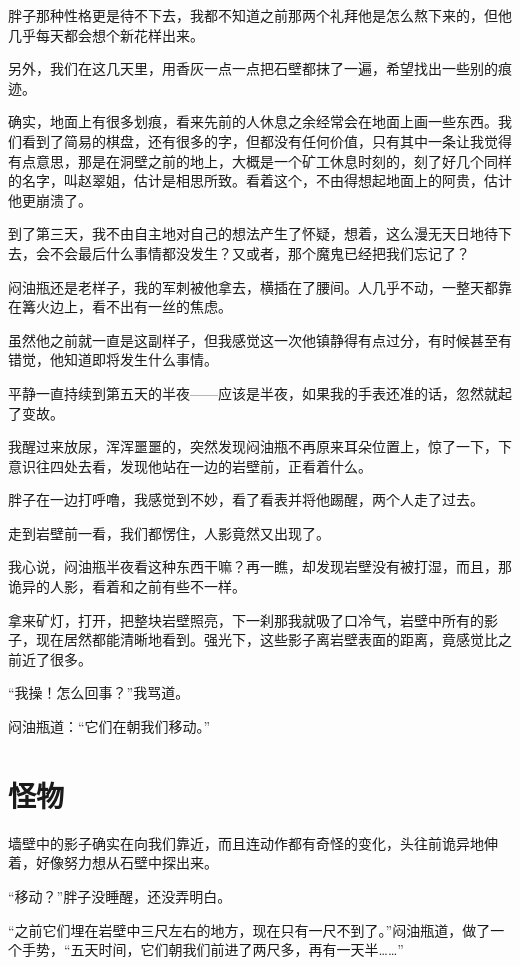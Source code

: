 胖子那种性格更是待不下去，我都不知道之前那两个礼拜他是怎么熬下来的，但他几乎每天都会想个新花样出来。

另外，我们在这几天里，用香灰一点一点把石壁都抹了一遍，希望找出一些别的痕迹。

确实，地面上有很多划痕，看来先前的人休息之余经常会在地面上画一些东西。我们看到了简易的棋盘，还有很多的字，但都没有任何价值，只有其中一条让我觉得有点意思，那是在洞壁之前的地上，大概是一个矿工休息时刻的，刻了好几个同样的名字，叫赵翠姐，估计是相思所致。看着这个，不由得想起地面上的阿贵，估计他更崩溃了。

到了第三天，我不由自主地对自己的想法产生了怀疑，想着，这么漫无天日地待下去，会不会最后什么事情都没发生？又或者，那个魔鬼已经把我们忘记了？

闷油瓶还是老样子，我的军刺被他拿去，横插在了腰间。人几乎不动，一整天都靠在篝火边上，看不出有一丝的焦虑。

虽然他之前就一直是这副样子，但我感觉这一次他镇静得有点过分，有时候甚至有错觉，他知道即将发生什么事情。

平静一直持续到第五天的半夜——应该是半夜，如果我的手表还准的话，忽然就起了变故。

我醒过来放尿，浑浑噩噩的，突然发现闷油瓶不再原来耳朵位置上，惊了一下，下意识往四处去看，发现他站在一边的岩壁前，正看着什么。

胖子在一边打呼噜，我感觉到不妙，看了看表并将他踢醒，两个人走了过去。

走到岩壁前一看，我们都愣住，人影竟然又出现了。

我心说，闷油瓶半夜看这种东西干嘛？再一瞧，却发现岩壁没有被打湿，而且，那诡异的人影，看着和之前有些不一样。

拿来矿灯，打开，把整块岩壁照亮，下一刹那我就吸了口冷气，岩壁中所有的影子，现在居然都能清晰地看到。强光下，这些影子离岩壁表面的距离，竟感觉比之前近了很多。

“我操！怎么回事？”我骂道。

闷油瓶道：“它们在朝我们移动。”

\chapter{怪物}

墙壁中的影子确实在向我们靠近，而且连动作都有奇怪的变化，头往前诡异地伸着，好像努力想从石壁中探出来。

“移动？”胖子没睡醒，还没弄明白。

“之前它们埋在岩壁中三尺左右的地方，现在只有一尺不到了。”闷油瓶道，做了一个手势，“五天时间，它们朝我们前进了两尺多，再有一天半……”

